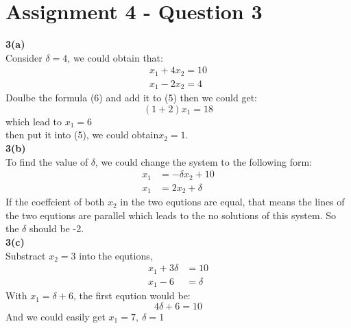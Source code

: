 \documentclass{article}
\begin{document}
\section*{Assignment 4 - Question 3}

\large{\textbf{3(a)}}\\
Consider $\delta = 4$, we could obtain that:
\begin{align}
    x_1 + 4x_2 = 10\\
    x_1 - 2x_2 = 4  
\end{align}
Doulbe the formula (6) and add it to (5) then we could get:
$$
(1 + 2) x_1 = 18
$$
which lead to $x_1 = 6$\\
then put it into (5), we could obtain$x_2 = 1$.
\\
\large{\textbf{3(b)}}\\
To find the value of $\delta$, we could change the system to the following form:
\begin{align*}
    x_1 &= - \delta x_2 + 10\\
    x_1 &= 2 x_2 + \delta
\end{align*}
If the coeffcient of both $x_2$ in the two equtions are equal, that means the lines of the two equtions are parallel which 
leads to the no solutions of this system.
So the $\delta$ should be -2.
\\
\large{\textbf{3(c)}}\\
Substract $x_2 = 3$ into the equtions,
\begin{align*}
    x_1 + 3 \delta &= 10\\
    x_1 - 6 &= \delta
\end{align*}
With $x_1 = \delta + 6$, the first eqution would be:
$$
4\delta + 6 = 10
$$
And we could easily get $x_1 = 7,\ \delta = 1$
\end{document}
